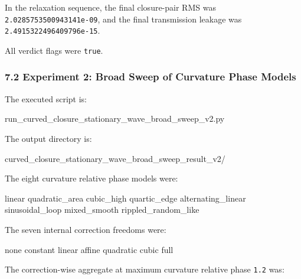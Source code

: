\documentclass[
  a4paper,
]{article}
\newenvironment{Shaded}{}{}
\newcommand{\NormalTok}[1]{#1}
\newcounter{none} %
\begin{document}
In the relaxation sequence, the final closure-pair RMS was
\texttt{2.0285753500943141e-09}, and the final transmission leakage was
\texttt{2.4915322496409796e-15}.

All verdict flags were \texttt{true}.

\subsubsection{7.2 Experiment 2: Broad Sweep of Curvature Phase
Models}\label{experiment-2-broad-sweep-of-curvature-phase-models}

The executed script is:

\begin{Shaded}
\begin{Highlighting}[]
\NormalTok{run\_curved\_closure\_stationary\_wave\_broad\_sweep\_v2.py}
\end{Highlighting}
\end{Shaded}

The output directory is:

\begin{Shaded}
\begin{Highlighting}[]
\NormalTok{curved\_closure\_stationary\_wave\_broad\_sweep\_result\_v2/}
\end{Highlighting}
\end{Shaded}

The eight curvature relative phase models were:

\begin{Shaded}
\begin{Highlighting}[]
\NormalTok{linear}
\NormalTok{quadratic\_area}
\NormalTok{cubic\_high}
\NormalTok{quartic\_edge}
\NormalTok{alternating\_linear}
\NormalTok{sinusoidal\_loop}
\NormalTok{mixed\_smooth}
\NormalTok{rippled\_random\_like}
\end{Highlighting}
\end{Shaded}

The seven internal correction freedoms were:

\begin{Shaded}
\begin{Highlighting}[]
\NormalTok{none}
\NormalTok{constant}
\NormalTok{linear}
\NormalTok{affine}
\NormalTok{quadratic}
\NormalTok{cubic}
\NormalTok{full}
\end{Highlighting}
\end{Shaded}

The correction-wise aggregate at maximum curvature relative phase
\texttt{1.2} was:
\end{document}
